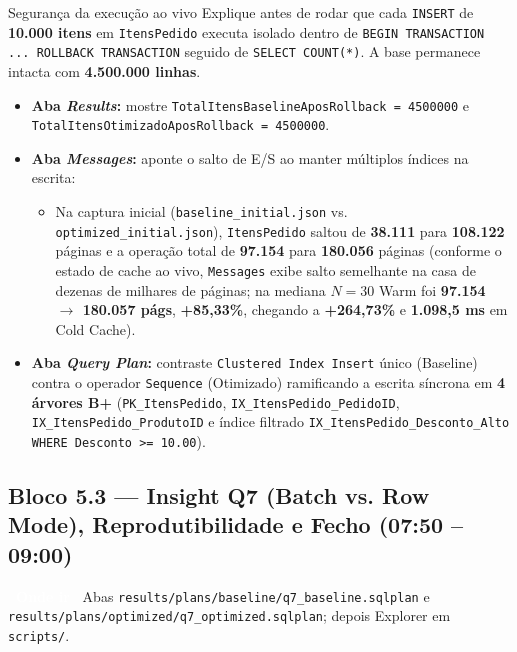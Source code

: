 \documentclass[10pt,a4paper]{article}
\newcommand{\tagAction}[1]{\colorbox{InfoBlue}{\textcolor{white}{\textbf{\footnotesize\ #1\ }}}}
\begin{document}
\begin{passoBox}[InfoBlue]{Segurança da execução ao vivo}
Explique antes de rodar que cada \texttt{INSERT} de \textbf{10.000 itens} em \texttt{ItensPedido} executa isolado dentro de \texttt{BEGIN TRANSACTION ... ROLLBACK TRANSACTION} seguido de \texttt{SELECT COUNT(*)}. A base permanece intacta com \textbf{4.500.000 linhas}.
\end{passoBox}

\begin{itemize}[leftmargin=14pt,itemsep=1.5pt,topsep=2pt]
  \item \textbf{Aba \emph{Results}:} mostre \texttt{TotalItensBaseline\allowbreak AposRollback = 4500000} e \texttt{TotalItensOtimizado\allowbreak AposRollback = 4500000}.
  \item \textbf{Aba \emph{Messages}:} aponte o salto de E/S ao manter múltiplos índices na escrita:
  \begin{itemize}[leftmargin=14pt,itemsep=1pt,topsep=1pt]
    \item Na captura inicial (\texttt{baseline\_initial.json} vs. \texttt{optimized\_initial.json}), \texttt{ItensPedido} saltou de \textbf{38.111} para \textbf{108.122} páginas e a operação total de \textbf{97.154} para \textbf{180.056} páginas (conforme o estado de cache ao vivo, \texttt{Messages} exibe salto semelhante na casa de dezenas de milhares de páginas; na mediana $N=30$ Warm foi \textbf{97.154 $\rightarrow$ 180.057 págs}, \textbf{+85,33\%}, chegando a \textbf{+264,73\%} e \textbf{1.098,5 ms} em Cold Cache).
  \end{itemize}
  \item \textbf{Aba \emph{Query Plan}:} contraste \texttt{Clustered Index Insert} único (Baseline) contra o operador \texttt{Sequence} (Otimizado) ramificando a escrita síncrona em \textbf{4 árvores B+} (\texttt{PK\_ItensPedido}, \texttt{IX\_ItensPedido\_\allowbreak PedidoID}, \texttt{IX\_ItensPedido\_ProdutoID} e índice filtrado \texttt{IX\_ItensPedido\_\allowbreak Desconto\_Alto WHERE Desconto >= 10.00}).
\end{itemize}

\subsection*{Bloco 5.3 — Insight Q7 (Batch vs. Row Mode), Reprodutibilidade e Fecho (07:50 -- 09:00)}
{\raggedright\tagAction{Onde ir} Abas \texttt{results/plans/baseline/q7\_baseline.sqlplan} e \texttt{results/plans/optimized/q7\_optimized.sqlplan}; depois Explorer em \texttt{scripts/}.\par}
\end{document}
